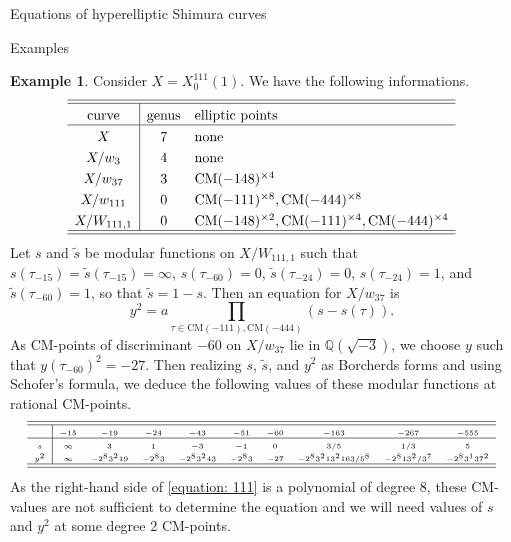 \documentclass{amsart}
\newcounter{lemma}
\theoremstyle{definition}
\newtheorem{Example}[lemma]{Example}
\def\Q{\mathbb Q}
\def\CM{\mathrm{CM}}
\def\wt{\widetilde}
\begin{document}
\begin{section}{Equations of hyperelliptic Shimura curves}
\begin{subsection}{Examples}
\begin{Example} Consider $X=X_0^{111}(1)$. We have the following
  informations.
  $$ \extrarowheight3pt
  \begin{array}{c|cl} \hline\hline
  \text{curve} & \text{genus} & \text{elliptic points} \\ \hline
   X & 7 & \text{none} \\
  X/w_3 & 4 & \text{none} \\
  X/w_{37} & 3 & \CM(-148)^{\times 4} \\
  X/w_{111} & 0 & \CM(-111)^{\times 8}, \CM(-444)^{\times 8} \\
  X/W_{111,1} & 0 & \CM(-148)^{\times 2}, \CM(-111)^{\times 4},
    \CM(-444)^{\times 4} \\ \hline\hline
  \end{array}
  $$
  Let $s$ and $\wt s$ be modular functions on $X/W_{111,1}$ such that
  $s(\tau_{-15})=\wt s(\tau_{-15})=\infty$, $s(\tau_{-60})=0$, $\wt
  s(\tau_{-24})=0$, $s(\tau_{-24})=1$, and $\wt s(\tau_{-60})=1$, so
  that $\wt s=1-s$. Then an equation for $X/w_{37}$ is
  \begin{equation} \label{equation: 111}
    y^2=a\prod_{\tau\in\CM(-111),\CM(-444)}(s-s(\tau)).
  \end{equation}
  As CM-points of discriminant $-60$ on $X/w_{37}$ lie in
  $\Q(\sqrt{-3})$, we choose $y$ such that $y(\tau_{-60})^2=-27$. Then
  realizing $s$, $\wt s$, and $y^2$ as Borcherds forms and using
  Schofer's formula, we deduce the following values of these modular
  functions at rational CM-points.
  $$ \tiny\extrarowheight3pt
  \begin{array}{c|ccccccccc} \hline\hline
    & -15 & -19 & -24 & -43 & -51 & -60 & -163 & -267 & -555 \\ \hline
  s & \infty & 3 & 1 & -3 & -1 & 0 & 3/5 & 1/3 & 5 \\
  y^2 & \infty & -2^83^219 & -2^83 & -2^83^243 & -2^83 & -27
      & -2^83^213^2163/5^8 & -2^813^2/3^7 & -2^83^137^2 \\
    \hline\hline
  \end{array}
  $$
  As the right-hand side of \eqref{equation: 111} is a polynomial of
  degree $8$, these CM-values are not sufficient to determine the
  equation and we will need values of $s$ and $y^2$ at some degree $2$
  CM-points.


\end{Example}
\end{subsection}
\end{section}
\end{document}
